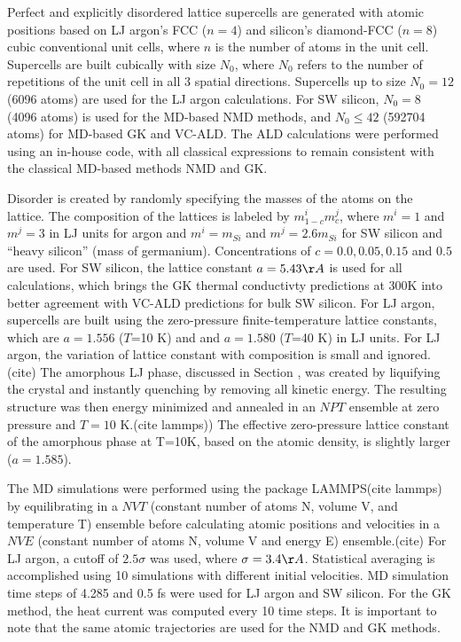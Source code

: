 \documentclass[aps,prb,onecolumn,preprint,superscriptaddress,amsmath,amssymb,floatfix]{revtex4}
\begin{document}
Perfect and explicitly disordered lattice supercells are generated 
with atomic positions 
based on LJ argon's FCC ($n=4$) and silicon's diamond-FCC ($n=8$) 
cubic conventional unit cells, where $n$ is the number of atoms 
in the unit cell.   
Supercells are built cubically with size $N_0$, where $N_0$ refers to the 
number of repetitions of the unit cell in all 3 
spatial directions. Supercells up to size $N_0 = 12$ 
(6096 atoms) are used for the LJ argon calculations. For SW silicon, 
$N_0 = 8$ (4096 atoms) is used for 
the MD-based NMD methods, and $N_0 \le 42$ (592704 atoms) 
for MD-based GK and VC-ALD. 
The ALD calculations were performed using an in-house code,
\cite{turney_predicting_2009} with all classical expressions to remain 
consistent with the classical MD-based methods NMD and GK. 

Disorder is created by randomly specifying the masses of the atoms 
on the lattice. 
The composition of the lattices is labeled by $m^i_{1-c}m^j_{c}$,  
where $m^i=1$ and $m^j=3$ in 
LJ units for argon and $m^i=m_{Si}$ and $m^j=2.6m_{Si}$ 
for SW silicon and ``heavy silicon'' (mass of germanium). Concentrations 
of $c=0.0,0.05,0.15$ and $0.5$ are used. 
For SW silicon, the lattice constant $a=5.43 \AA$ is used 
for all calculations, which brings the GK thermal conductivty 
predictions at 300K\cite{goicochea_thermal_2010,he_lattice_2012} 
into better agreement with VC-ALD predictions 
for bulk SW silicon.\cite{sellan_cross-plane_2010} 
For LJ argon, supercells are built using 
the zero-pressure finite-temperature lattice constants, 
which are $a=1.556$ ($T$=10 K) and 
and $a=1.580$ ($T$=40 K) in LJ units.\cite{mcgaughey_phonon_2004} 
For LJ argon, the variation of lattice constant 
with composition is small and ignored.(cite) 
The amorphous LJ phase, discussed in Section , was created by 
liquifying the crystal 
and instantly quenching by removing all kinetic energy.  The resulting 
structure was then energy minimized and annealed in an $NPT$ ensemble at 
zero pressure and $T=10$ K.(cite lammps)) 
The effective zero-pressure lattice constant  
of the amorphous phase at T=10K, based on the atomic 
density, is slightly larger 
($a = 1.585$).\cite{mcgaughey_phonon_2004}  

The MD simulations were performed using the package LAMMPS(cite lammps)  
by equilibrating in a $NVT$ (constant 
number of atoms N, volume V, and temperature T) ensemble before 
calculating atomic positions and velocities in a $NVE$ 
(constant number of 
atoms N, volume V and energy E) ensemble.(cite) For LJ argon, a cutoff 
of $2.5\sigma$ was used, where $\sigma = 3.4 \AA$. 
Statistical averaging is accomplished 
using 10 simulations with different initial velocities. MD simulation 
time steps of 
4.285 and 0.5 fs were used for LJ argon and SW silicon. 
For the GK method, the heat current 
was computed every 10 time steps. It is important to note that the same 
atomic trajectories are used for the NMD and GK methods. 
\end{document}
